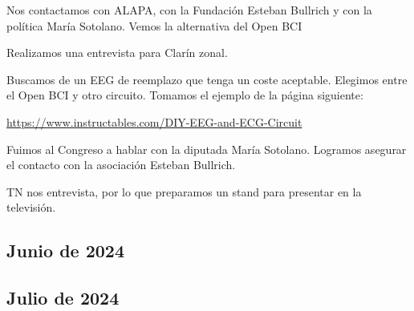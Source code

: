 \documentclass{article}
\begin{document}
Nos contactamos con ALAPA, con la Fundación Esteban Bullrich y con la política María Sotolano. Vemos la alternativa del Open BCI




Realizamos una entrevista para Clarín zonal.




Buscamos de un EEG de reemplazo que tenga un coste aceptable. Elegimos entre el Open BCI y otro circuito. Tomamos el ejemplo de la página siguiente: 

\begin{center}
    \href{https://www.instructables.com/DIY-EEG-and-ECG-Circuit/}{https://www.instructables.com/DIY-EEG-and-ECG-Circuit}
\end{center}





Fuimos al Congreso a hablar con la diputada María Sotolano. Logramos asegurar el contacto con la asociación Esteban Bullrich.





TN nos entrevista, por lo que preparamos un stand para presentar en la televisión.











\begin{center}
    \section{Junio de 2024}
\end{center}



\newpage







\begin{center}
    \section{Julio de 2024}
\end{center}



\newpage
\end{document}
